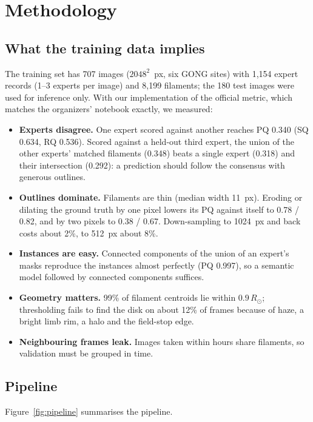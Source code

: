 \documentclass[sigconf]{acmart}
\begin{document}
\section{Methodology}\label{sec:methodology}

\subsection{What the training data implies}\label{sec:analysis}
The training set has 707 images ($2048^2$~px, six GONG sites) with 1,154 expert records (1--3 experts per image) and 8,199 filaments; the 180 test images were used for inference only. With our implementation of the official metric, which matches the organizers' notebook exactly, we measured:
\begin{itemize}
    \item \textbf{Experts disagree.} One expert scored against another reaches PQ 0.340 (SQ 0.634, RQ 0.536). Scored against a held-out third expert, the union of the other experts' matched filaments (0.348) beats a single expert (0.318) and their intersection (0.292): a prediction should follow the consensus with generous outlines.
    \item \textbf{Outlines dominate.} Filaments are thin (median width 11~px). Eroding or dilating the ground truth by one pixel lowers its PQ against itself to 0.78 / 0.82, and by two pixels to 0.38 / 0.67. Down-sampling to 1024~px and back costs about 2\%, to 512~px about 8\%.
    \item \textbf{Instances are easy.} Connected components of the union of an expert's masks reproduce the instances almost perfectly (PQ 0.997), so a semantic model followed by connected components suffices.
    \item \textbf{Geometry matters.} 99\% of filament centroids lie within $0.9\,R_\odot$; thresholding fails to find the disk on about 12\% of frames because of haze, a bright limb rim, a halo and the field-stop edge.
    \item \textbf{Neighbouring frames leak.} Images taken within hours share filaments, so validation must be grouped in time.
\end{itemize}

\subsection{Pipeline}
Figure~\ref{fig:pipeline} summarises the pipeline.
\end{document}
